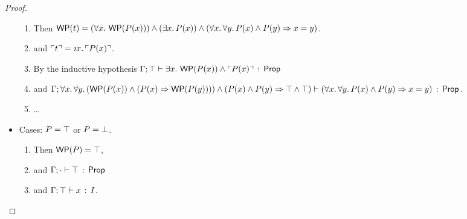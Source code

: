 \documentclass[10pt,a4paper]{article}
\begin{document}
\begin{proof}
\begin{itemize}
    \begin{enumerate}
      \item 
        Then
        $\mathop{\mathsf{WP}}(t) = 
        (\forall x.\, \mathop{\mathsf{WP}}(P(x))) \wedge (\exists x.\, P(x)) \wedge (\forall x.\, \forall y.\, P(x) \wedge P(y) \Rightarrow x=y)$.
      \item
        and 
        $\trans{\t} = \tDesc{\x}{\I}{\trans{\p(\x)}}$.
      \item 
        By the inductive hypothesis
        $\Gamma;\top \vdash \exists x.\, \mathop{\mathsf{WP}}(P(x)) \wedge \ulcorner P(x) \urcorner\, :\, \mathsf{Prop}$
      \item
        and 
        $\Gamma;\forall x.\, \forall y.\, (\mathop{\mathsf{WP}}(P(x)) \wedge (P(x) \Rightarrow \mathop{\mathsf{WP}}(P(y)))) \wedge (P(x) \wedge P(y) \Rightarrow \top \wedge \top) \vdash (\forall x.\, \forall y.\, P(x) \wedge P(y) \Rightarrow x=y)\, :\, \mathsf{Prop}$.
        \item \ldots
      \end{enumerate}
      
  \item Cases: $P = \top$ or $P = \bot$.
      \begin{enumerate}
      \item 
      	Then $\mathop{\mathsf{WP}}(P) = \top$,
      \item
        and $\Gamma;\cdot \vdash \top\, :\, \mathsf{Prop}$ 
      \item
        and $\Gamma;\top \vdash x\, :\, I$.
      \end{enumerate}
      

\end{itemize}
\end{proof}
\end{document}
